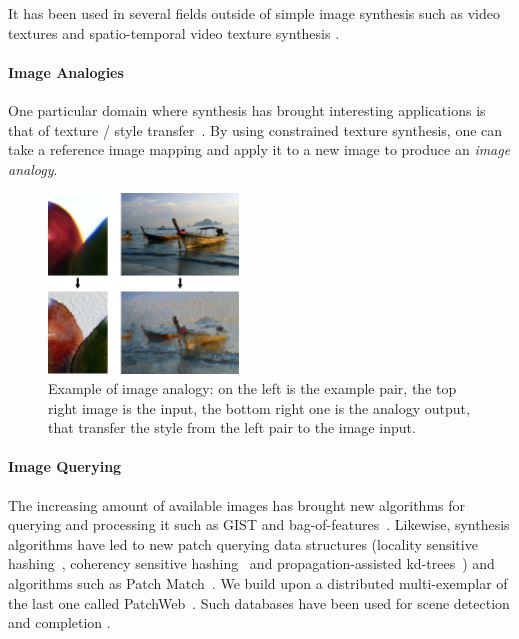 It has been used in several fields outside of simple image synthesis \cite{Wei09} such as video textures \cite{Schodl00, Schodl02, Agarwala05} and spatio-temporal video texture synthesis \cite{Kwatra03, Wexler07}.

\paragraph{Image Analogies}
One particular domain where synthesis has brought interesting applications is that of texture / style transfer~\cite{Efros01, Hertzmann01}. By using constrained texture synthesis, one can take a reference image mapping and apply it to a new image to produce an \emph{image analogy}. 

\begin{figure}[ht]
	\center
	\includegraphics[width=0.45\textwidth]{figures/analogies}
	\caption{Example of image analogy: on the left is the example pair, the top right image is the input, the bottom right one is the analogy output, that transfer the style from the left pair to the image input.}
\end{figure}

\paragraph{Image Querying}
The increasing amount of available images has brought new algorithms for querying and processing it such as GIST and bag-of-features~\cite{Oliva01, Torralba08, Douze09}.
Likewise, synthesis algorithms have led to new patch querying data structures (locality sensitive hashing~\cite{Gionis99}, coherency sensitive hashing~\cite{Korman11} and propagation-assisted kd-trees~\cite{He12}) and algorithms such as Patch Match~\cite{Barnes09}.
We build upon a distributed multi-exemplar of the last one called PatchWeb~\cite{Barnes11}.
Such databases have been used for scene detection and completion \cite{Hays07}.


